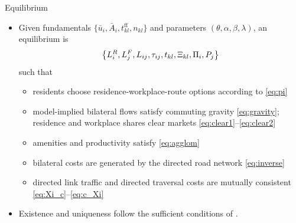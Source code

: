 \documentclass[11pt,aspectratio=169]{beamer}
\newcommand{\app}[1]{\allowbreak\hspace{0.25em}\hyperlink{#1}{\beamergotobutton{details}}}
\begin{document}
\begin{frame}{Equilibrium}
\begin{itemize}
  \item Given fundamentals $\{\bar u_i,\bar A_i,t^{\text{ff}}_{kl},n_{kl}\}$ and parameters $(\theta,\alpha,\beta,\lambda)$, an equilibrium is
  \vspace{-0.5em}\begin{equation}
    \left\{L_i^R,L_j^F,L_{ij},\tau_{ij},t_{kl},\Xi_{kl},\Pi_i,P_j\right\}
  \vspace{-0.5em}\end{equation}
  such that
  \begin{itemize}
    \item residents choose residence-workplace-route options according to \eqref{eq:pi}
    \item model-implied bilateral flows satisfy commuting gravity \eqref{eq:gravity}; residence and workplace shares clear markets \eqref{eq:clear1}--\eqref{eq:clear2}
    \item amenities and productivity satisfy \eqref{eq:agglom}
    \item bilateral costs are generated by the directed road network \eqref{eq:inverse}
    \item directed link traffic and directed traversal costs are mutually consistent \eqref{eq:Xi_c}--\eqref{eq:c_Xi}
  \end{itemize}
  \item Existence and uniqueness follow the sufficient conditions of \citet[Proposition~1]{allenarkolakis2022}. \app{appexist}
\end{itemize}
\end{frame}

\end{document}
